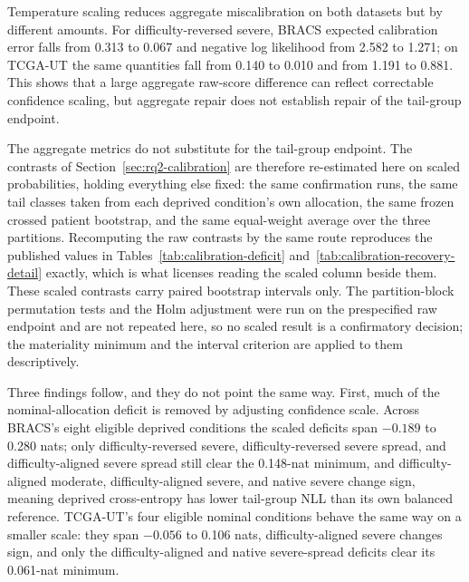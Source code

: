 \noindent Temperature scaling reduces aggregate miscalibration on both datasets but by different amounts. For difficulty-reversed severe, BRACS expected calibration error falls from \num{0.313} to \num{0.067} and negative log likelihood from \num{2.582} to \num{1.271}; on TCGA-UT the same quantities fall from \num{0.140} to \num{0.010} and from \num{1.191} to \num{0.881}. This shows that a large aggregate raw-score difference can reflect correctable confidence scaling, but aggregate repair does not establish repair of the tail-group endpoint.

The aggregate metrics do not substitute for the tail-group endpoint. The contrasts of Section~\ref{sec:rq2-calibration} are therefore re-estimated here on scaled probabilities, holding everything else fixed: the same confirmation runs, the same tail classes taken from each deprived condition's own allocation, the same frozen crossed patient bootstrap, and the same equal-weight average over the three partitions. Recomputing the raw contrasts by the same route reproduces the published values in Tables~\ref{tab:calibration-deficit} and~\ref{tab:calibration-recovery-detail} exactly, which is what licenses reading the scaled column beside them. These scaled contrasts carry paired bootstrap intervals only. The partition-block permutation tests and the Holm adjustment were run on the prespecified raw endpoint and are not repeated here, so no scaled result is a confirmatory decision; the materiality minimum and the interval criterion are applied to them descriptively.

Three findings follow, and they do not point the same way. First, much of the nominal-allocation deficit is removed by adjusting confidence scale. Across BRACS's eight eligible deprived conditions the scaled deficits span $-\num{0.189}$ to \num{0.280} nats; only difficulty-reversed severe, difficulty-reversed severe spread, and difficulty-aligned severe spread still clear the \num{0.148}-nat minimum, and difficulty-aligned moderate, difficulty-aligned severe, and native severe change sign, meaning deprived cross-entropy has lower tail-group NLL than its own balanced reference. TCGA-UT's four eligible nominal conditions behave the same way on a smaller scale: they span $-\num{0.056}$ to \num{0.106} nats, difficulty-aligned severe changes sign, and only the difficulty-aligned and native severe-spread deficits clear its \num{0.061}-nat minimum.

